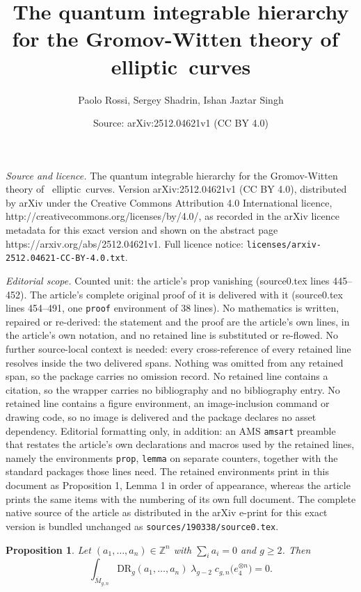 \documentclass[10pt,a4paper]{amsart}
\title{The quantum integrable hierarchy for the Gromov-Witten theory of~ elliptic~curves}
\author{Paolo Rossi, Sergey Shadrin, Ishan Jaztar Singh}
\date{Source: arXiv:2512.04621v1 (CC BY 4.0)}
\newtheorem{prop}{Proposition}
\begin{document}
\maketitle

\noindent\emph{Source and licence.} The quantum integrable hierarchy for the Gromov-Witten theory of~ elliptic~curves. Version arXiv:2512.04621v1 (CC BY 4.0), distributed by arXiv under the Creative Commons Attribution 4.0 International licence, http://creativecommons.org/licenses/by/4.0/, as recorded in the arXiv licence metadata for this exact version and shown on the abstract page https://arxiv.org/abs/2512.04621v1. Full licence notice: \texttt{licenses/arxiv-2512.04621-CC-BY-4.0.txt}.\par\smallskip

\noindent\textit{Editorial scope.} Counted unit: the article's prop vanishing (source0.tex lines 445--452). The article's complete original proof of it is delivered with it (source0.tex lines 454--491, one \texttt{proof} environment of 38 lines). No mathematics is written, repaired or re-derived: the statement and the proof are the article's own lines, in the article's own notation, and no retained line is substituted or re-flowed.  No further source-local context is needed: every cross-reference of every retained line resolves inside the two delivered spans.  Nothing was omitted from any retained span, so the package carries no omission record.  No retained line contains a citation, so the wrapper carries no bibliography and no bibliography entry.  No retained line contains a figure environment, an image-inclusion command or drawing code, so no image is delivered and the package declares no asset dependency.  Editorial formatting only, in addition: an AMS \texttt{amsart} preamble that restates the article's own declarations and macros used by the retained lines, namely the environments \texttt{prop}, \texttt{lemma} on separate counters, together with the standard packages those lines need.  The retained environments print in this document as Proposition 1, Lemma 1 in order of appearance, whereas the article prints the same items with the numbering of its own full document.  The complete native source of the article as distributed in the arXiv e-print for this exact version is bundled unchanged as \texttt{sources/190338/source0.tex}.
\begin{prop}\label{prop: vanishing}
Let $(a_1,\dots,a_n)\in\mathbb{Z}^n$ with $\sum_i a_i=0$ and $g\geq 2$.
Then
\[ 
\int_{\overline{M}_{g,n}} \mathrm{DR}_g(a_1,\ldots,a_n) \; \lambda_{g-2}\;c_{g,n}\!\big(e_4^{\otimes n}\big) =0.
\]
\end{prop}
\end{document}
